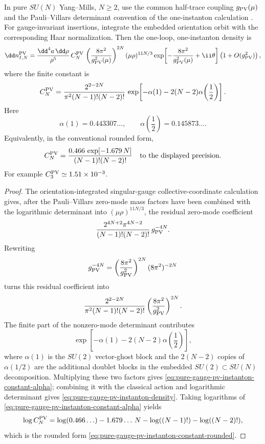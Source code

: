\begin{proposition}
\label{prop:pure-gauge-pv-instanton-determinant-constant}
In pure \(SU(N)\) Yang--Mills, \(N\geq2\), use the common half-trace
coupling \(g_{\rm PV}(\mu)\) and the Pauli--Villars determinant convention of
the one-instanton calculation
\cite{tHooft1976Pseudoparticle,Bernard1979InstantonDeterminants}.  For
gauge-invariant insertions, integrate the embedded orientation orbit with the
corresponding Haar normalization.  Then the one-loop, one-instanton density is
\begin{equation}
  \dd n^{\rm PV}_{I,N}
  =
  \frac{\dd^4a\,\dd\rho}{\rho^5}\,
  C^{\rm PV}_{N}\,
  \left(\frac{8\pi^2}{g_{\rm PV}^2(\mu)}\right)^{2N}
  (\mu\rho)^{11N/3}
  \exp\!\left[-\frac{8\pi^2}{g_{\rm PV}^2(\mu)}+\ii\theta\right]
  \left(1+O(g_{\rm PV}^2)\right),
  \label{eq:pure-gauge-pv-instanton-density}
\end{equation}
where the finite constant is
\begin{equation}
  C^{\rm PV}_{N}
  =
  \frac{2^{2-2N}}{\pi^2 (N-1)!(N-2)!}\,
  \exp\!\left[-\alpha(1)-2(N-2)\alpha\!\left(\frac12\right)\right].
  \label{eq:pure-gauge-pv-instanton-constant-alpha}
\end{equation}
Here
\[
  \alpha(1)=0.443307\ldots,\qquad
  \alpha\!\left(\frac12\right)=0.145873\ldots .
\]
Equivalently, in the conventional rounded form,
\begin{equation}
  C^{\rm PV}_{N}
  =
  \frac{0.466\,\exp[-1.679\,N]}{(N-1)!(N-2)!}
  \quad\hbox{to the displayed precision}.
  \label{eq:pure-gauge-pv-instanton-constant-rounded}
\end{equation}
For example \(C^{\rm PV}_{3}\simeq1.51\times10^{-3}\).
\end{proposition}

\begin{proof}
The orientation-integrated singular-gauge collective-coordinate calculation
gives, after the Pauli--Villars zero-mode mass factors have been combined with
the logarithmic determinant into \((\mu\rho)^{11N/3}\), the residual
zero-mode coefficient
\[
  \frac{2^{4N+2}\pi^{4N-2}}{(N-1)!(N-2)!}\,g_{\rm PV}^{-4N}.
\]
Rewriting
\[
  g_{\rm PV}^{-4N}
  =
  \left(\frac{8\pi^2}{g_{\rm PV}^2}\right)^{2N}
  (8\pi^2)^{-2N}
\]
turns this residual coefficient into
\[
  \frac{2^{2-2N}}{\pi^2 (N-1)!(N-2)!}
  \left(\frac{8\pi^2}{g_{\rm PV}^2}\right)^{2N}.
\]
The finite part of the nonzero-mode determinant contributes
\[
  \exp\!\left[-\alpha(1)-2(N-2)\alpha\!\left(\frac12\right)\right],
\]
where \(\alpha(1)\) is the \(SU(2)\) vector-ghost block and the
\(2(N-2)\) copies of \(\alpha(1/2)\) are the additional doublet blocks in the
embedded \(SU(2)\subset SU(N)\) decomposition.  Multiplying these two factors
gives \eqref{eq:pure-gauge-pv-instanton-constant-alpha}; combining it with
the classical action and logarithmic determinant gives
\eqref{eq:pure-gauge-pv-instanton-density}.  Taking logarithms of
\eqref{eq:pure-gauge-pv-instanton-constant-alpha} yields
\[
  \log C^{\rm PV}_{N}
  =
  \log(0.466\ldots)-1.679\ldots\,N
  -\log((N-1)!)-\log((N-2)!),
\]
which is the rounded form
\eqref{eq:pure-gauge-pv-instanton-constant-rounded}.
\end{proof}

